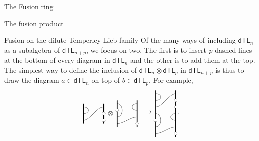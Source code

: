 \documentclass[reqno]{amsart}
\newtheorem{Prop}[Thm]{Proposition}
\newcommand{\vac}[1]{\draw (#1) circle (1/5);
 	\fill[white] (#1) circle (1/5)}
\newcommand{\dtl}[1]{\mathsf{dTL}_{#1}}
\newcommand{\xf}{\times\hspace{-0.27em}_f}
\begin{document}
\begin{section}{The Fusion ring}
\begin{subsection}{The fusion product}
\end{subsection}
\begin{subsection}{Fusion on the dilute Temperley-Lieb family}
Of the many ways of including $\dtl{n}$ as a subalgebra of $\dtl{n+p}$, we focus on two. The first is to insert $p$ dashed lines at the bottom of every diagram in $\dtl{n}$ and the other is to add them at the top. The simplest way to define the inclusion of $\dtl{n}\otimes\dtl{p}$ in $\dtl{n+p}$ is thus to draw the diagram $a\in \dtl{n}$ on top of $b\in\dtl{p}$. For example,
\begin{equation}
\begin{tikzpicture}[baseline={(current bounding box.center)},scale = 1/3]
\draw[very thick] (0,-3/2) -- (0,3/2);
\draw[very thick] (3,-3/2) -- (3,3/2);
	\draw (0,-1) .. controls (1,-1) and (2,1) .. (3,1);
	\draw (0,0) .. controls (1,0) and (1,1) .. (0,1);
	\vac{3,0};
	\vac{3,-1};
%
\node  at (4,0) {$\otimes$};
%
\draw[very thick] (5,-2) -- (5,2);
\draw[very thick] (8,-2) -- (8,2);
	\draw (5,-3/2) .. controls (6,-3/2) and (7,-1/2) .. (8,-1/2);
	\draw (5,-1/2) .. controls (6,-1/2) and (6,3/2) .. (5,3/2);
	\vac{5,1/2};
	\vac{8,-3/2};
	\draw (8,1/2) .. controls (7,1/2) and (7,3/2) .. (8,3/2);
\end{tikzpicture}
\longrightarrow
\begin{tikzpicture}[baseline={(current bounding box.center)},scale = 1/3]
\draw[very thick] (0,-7/2) -- (0,7/2);
\draw[very thick] (3,-7/2) -- (3,7/2);
	\draw (0,1) .. controls (1,1) and (2,3) .. (3,3);
	\draw (0,2) .. controls (1,2) and (1,3) .. (0,3);
	\vac{3,2};
	\vac{3,1};
%
	\draw (0,-3) .. controls (1,-3) and (2,-2) .. (3,-2);
	\draw (0,-2) .. controls (1,-2) and (1, 0) .. (0,0);
	\vac{0,-1};
	\vac{3,-3};
	\draw (3,-1) .. controls (2,-1) and (2,0) .. (3,0);
\end{tikzpicture}.
\end{equation}


\end{subsection}
\end{section}
\end{document}
